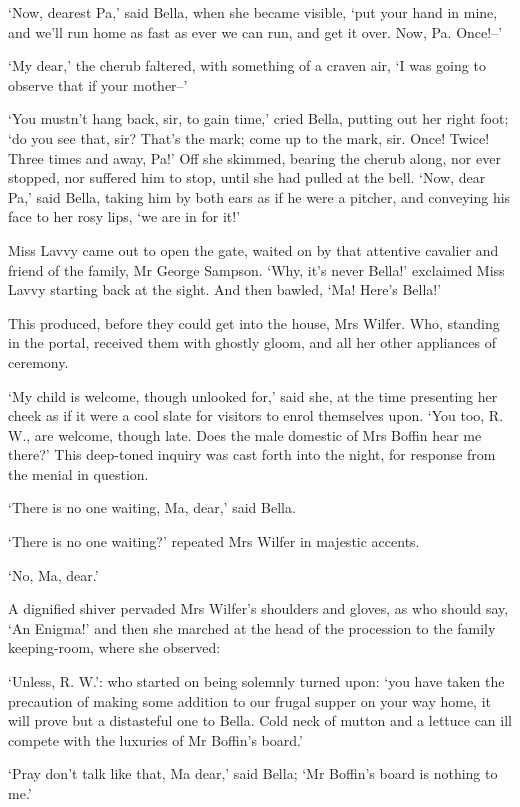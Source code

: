 ‘Now, dearest Pa,’ said Bella, when she became visible, ‘put your hand
in mine, and we’ll run home as fast as ever we can run, and get it over.
Now, Pa. Once!--’

‘My dear,’ the cherub faltered, with something of a craven air, ‘I was
going to observe that if your mother--’

‘You mustn’t hang back, sir, to gain time,’ cried Bella, putting out her
right foot; ‘do you see that, sir? That’s the mark; come up to the mark,
sir. Once! Twice! Three times and away, Pa!’ Off she skimmed, bearing
the cherub along, nor ever stopped, nor suffered him to stop, until she
had pulled at the bell. ‘Now, dear Pa,’ said Bella, taking him by both
ears as if he were a pitcher, and conveying his face to her rosy lips,
‘we are in for it!’

Miss Lavvy came out to open the gate, waited on by that attentive
cavalier and friend of the family, Mr George Sampson. ‘Why, it’s never
Bella!’ exclaimed Miss Lavvy starting back at the sight. And then
bawled, ‘Ma! Here’s Bella!’

This produced, before they could get into the house, Mrs Wilfer. Who,
standing in the portal, received them with ghostly gloom, and all her
other appliances of ceremony.

‘My child is welcome, though unlooked for,’ said she, at the time
presenting her cheek as if it were a cool slate for visitors to enrol
themselves upon. ‘You too, R. W., are welcome, though late. Does the
male domestic of Mrs Boffin hear me there?’ This deep-toned inquiry was
cast forth into the night, for response from the menial in question.

‘There is no one waiting, Ma, dear,’ said Bella.

‘There is no one waiting?’ repeated Mrs Wilfer in majestic accents.

‘No, Ma, dear.’

A dignified shiver pervaded Mrs Wilfer’s shoulders and gloves, as
who should say, ‘An Enigma!’ and then she marched at the head of the
procession to the family keeping-room, where she observed:

‘Unless, R. W.’: who started on being solemnly turned upon: ‘you have
taken the precaution of making some addition to our frugal supper on
your way home, it will prove but a distasteful one to Bella. Cold neck
of mutton and a lettuce can ill compete with the luxuries of Mr Boffin’s
board.’

‘Pray don’t talk like that, Ma dear,’ said Bella; ‘Mr Boffin’s board is
nothing to me.’

